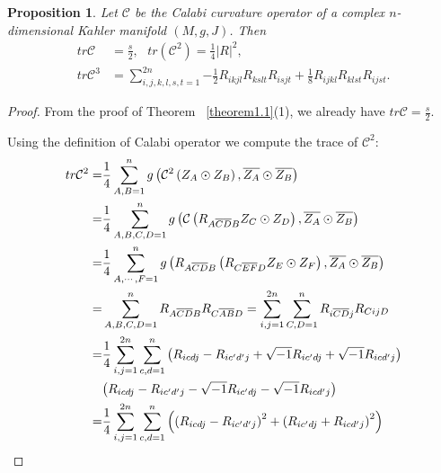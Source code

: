 \documentclass{amsart}
\newtheorem{proposition}[theorem]{Proposition}
\theoremstyle{definition}
\theoremstyle{remark}
\numberwithin{equation}{section}
\begin{document}
\begin{proposition}
\label{pro4.2}
Let ${\mathcal{C} }$ be the Calabi curvature operator of a complex $n$-dimensional K$\ddot a$hler manifold $\left(M,g,J\right)$. Then
\begin{align*}
tr\mathcal{C}& = \frac{s}{2}, \ \ \ tr\left( {{\mathcal{C}^2}} \right) = \frac{1}{4}{\left| R \right|^2},\\
 tr{\mathcal{C}^3}& =  \sum\limits_{i,j,k,l,s,t = 1}^{2n} { - \frac{1}{2}{R_{ikjl}}{R_{kslt}}{R_{isjt}} + \frac{1}{8}{R_{ijkl}}{R_{klst}}{R_{ijst}}}. \end{align*}
\end{proposition}
\begin{proof}
From the proof of Theorem ~\ref{theorem1.1}(1), we already have $tr\mathcal{C} = \frac{s}{2}$.

Using the definition of Calabi operator
we compute the trace of ${\mathcal{C}^2}$:
\begin{align*}
  tr{\mathcal{C}^2} =& \frac{1}{4}\sum\limits_{A,B = 1}^n {g\left( {{\mathcal{C}^2}\left( {{Z_A} \odot {Z_B}} \right),\overline {{Z_A}}  \odot \overline {{Z_B}} } \right)}  \\
   =& \frac{1}{4}\sum\limits_{A,B,C,D = 1}^n {g\left( {\mathcal{C}\left( {{R_{A\overline C \overline D B}}{Z_C} \odot {Z_D}} \right),\overline {{Z_A}}  \odot \overline {{Z_B}} } \right)}  \\
   =& \frac{1}{4}\sum\limits_{A, \cdots ,F = 1}^n {g\left( {{R_{A\overline C \overline D B}}\left( {{R_{C\overline E \overline F D}}{Z_E} \odot {Z_F}} \right),\overline {{Z_A}}  \odot \overline {{Z_B}} } \right)}   \\
   =& \sum\limits_{A,B,C,D = 1}^n {{R_{A\overline C \overline D B}}{R_{C\overline A \overline B D}}}
   = \sum\limits_{i,j = 1}^{2n} {\sum\limits_{C,D = 1}^n {{R_{i\overline C \overline D j}}{R_{CijD}}} }   \\
   =& \frac{1}{4}\sum\limits_{i,j = 1}^{2n} {\sum\limits_{c,d = 1}^n {\left( {{R_{icdj}} - {R_{ic'd'j}} + \sqrt { - 1} {R_{ic'dj}} + \sqrt { - 1} {R_{icd'j}}} \right)}}\\
    &{{\left( {{R_{icdj}} - {R_{ic'd'j}} - \sqrt { - 1} {R_{ic'dj}} - \sqrt { - 1} {R_{icd'j}}} \right)} }  \hfill \\
   =& \frac{1}{4}\sum\limits_{i,j = 1}^{2n} {\sum\limits_{c,d = 1}^n {\left( {{{\left( {{R_{icdj}} - {R_{ic'd'j}}} \right)}^2} + {{\left( {{R_{ic'dj}} + {R_{icd'j}}} \right)}^2}} \right)} }   \\

\end{align*}
\end{proof}
\end{document}
